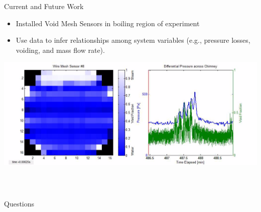 \documentclass[10pt,t,xcolor=table]{UWMadBeamer}
\begin{document}

\begin{frame} {Current and Future Work}

    \begin{itemize}
        \item Installed Void Mesh Sensors in boiling region of experiment
        \item Use data to infer relationships among system variables (e.g., pressure losses, voiding, and mass flow rate).
    \end{itemize}

        {
        \centering
        \hfill
        \includegraphics[height=0.50\paperheight]{VoidData_01}%
        \hfill
        }
        
\end{frame}





\begin{frame}
    \frametitle{~\ }
    \vbox{}\vfill
    \hfill{\Large Questions}\hfill
    \vbox{}\vfill
\end{frame}
\end{document}
